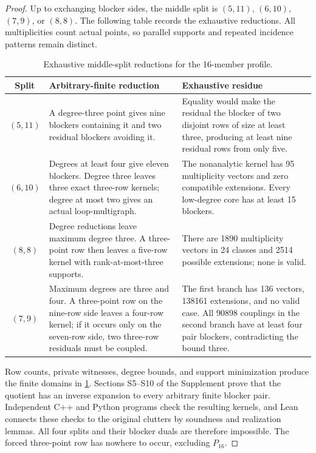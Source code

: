 \documentclass[11pt]{article}
\theoremstyle{definition}
\theoremstyle{remark}
\begin{document}
\begin{proof}
Up to exchanging blocker sides, the middle split is $(5,11)$, $(6,10)$,
$(7,9)$, or $(8,8)$.  The following table records the exhaustive reductions.
All multiplicities count actual points, so parallel supports and repeated
incidence patterns remain distinct.
\begin{table}[htbp]
\centering
\small
\setlength{\tabcolsep}{5pt}
\renewcommand{\arraystretch}{1.16}
\begin{tabular}{c p{} p{}}
\toprule
Split & Arbitrary-finite reduction & Exhaustive residue \\
\midrule
$(5,11)$ & A degree-three point gives nine blockers containing it and two
residual blockers avoiding it. & Equality would make the residual the blocker
of two disjoint rows of size at least three, producing at least nine residual
rows from only five. \\
$(6,10)$ & Degrees at least four give eleven blockers.  Degree three leaves
three exact three-row kernels; degree at most two gives an actual
loop-multigraph. & The nonanalytic kernel has 95 multiplicity vectors and zero
compatible extensions.  Every low-degree core has at least 15 blockers. \\
$(8,8)$ & Degree reductions leave maximum degree three.  A three-point row
then leaves a five-row kernel with rank-at-most-three supports. & There are
1890 multiplicity vectors in 24 classes and 2514 possible extensions; none is
valid. \\
$(7,9)$ & Maximum degrees are three and four.  A three-point row on the
nine-row side leaves a four-row kernel; if it occurs only on the seven-row
side, two three-row residuals must be coupled. & The first branch has 136
vectors, 138161 extensions, and no valid case.  All 90898 couplings in the
second branch have at least four pair blockers, contradicting the bound three.
\\
\bottomrule
\end{tabular}
\caption{Exhaustive middle-split reductions for the 16-member profile.}
\label{tab:exact-splits}
\end{table}

Row counts, private witnesses, degree bounds, and support minimization produce
the finite domains in \cref{tab:exact-splits}.  Sections S5--S10 of the
Supplement prove that the quotient has an inverse expansion to every
arbitrary finite blocker pair.  Independent C++ and Python programs check the
resulting kernels, and Lean connects these checks to the original clutters by
soundness and realization lemmas.  All four splits and their blocker duals
are therefore impossible.  The forced three-point row has nowhere to occur,
excluding $P_{16}$.
\end{proof}
\end{document}
